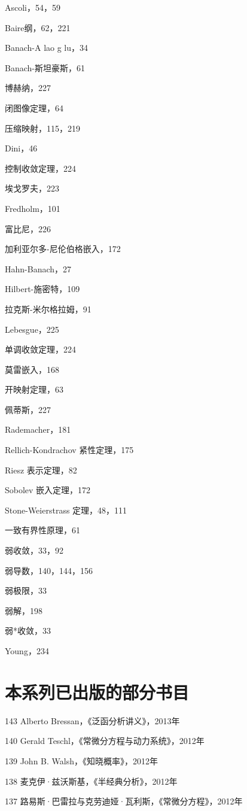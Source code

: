 \documentclass[10pt,b5paper,openany,twoside]{ctexbook}
\begin{document}
Ascoli，54，59

Baire纲，62，221

Banach-A lao g lu，34

Banach-斯坦豪斯，61

博赫纳，227

闭图像定理，64

压缩映射，115，219

Dini，46

控制收敛定理，224

埃戈罗夫，223

Fredholm，101

富比尼，226

加利亚尔多-尼伦伯格嵌入，172

Hahn-Banach，27

Hilbert-施密特，109

拉克斯-米尔格拉姆，91

Lebesgue，225

单调收敛定理，224

莫雷嵌入，168

开映射定理，63

佩蒂斯，227

Rademacher，181

Rellich-Kondrachov 紧性定理，175

Riesz 表示定理，82

Sobolev 嵌入定理，172

Stone-Weierstrass 定理，48，111

一致有界性原理，61

弱收敛，33，92

弱导数，140，144，156

弱极限，33

弱解，198

弱*收敛，33

Young，234

\section*{本系列已出版的部分书目}

143 Alberto Bressan，《泛函分析讲义》，2013年

140 Gerald Teschl，《常微分方程与动力系统》，2012年

139 John B. Walsh，《知晓概率》，2012年

138 麦克伊·兹沃斯基，《半经典分析》，2012年

137 路易斯·巴雷拉与克劳迪娅·瓦利斯，《常微分方程》，2012年
\end{document}
